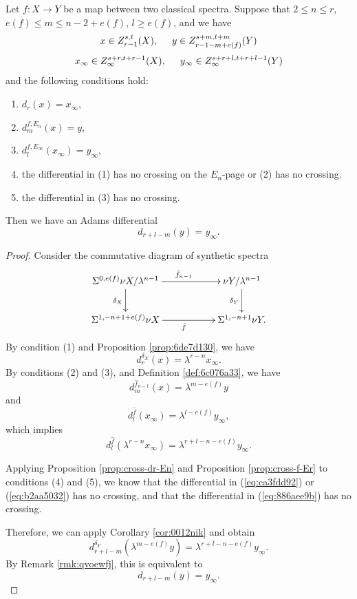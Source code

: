 \documentclass{amsart}
\numberwithin{equation}{section}
\begin{document}
\begin{theorem}\label{thm:e73f481e}
    Let $f: X\to Y$ be a map between two classical spectra.
    Suppose that $2\le n\le r$, $e(f)\le m\le n-2+e(f)$, $l\ge e(f)$, and we have
    $$x\in Z_{r-1}^{s,t}(X), \hspace{0.5cm} y\in Z_{r-1-m+e(f)}^{s+m,t+m}(Y)$$
    $$x_\infty\in Z_\infty^{s+r,t+r-1}(X), \hspace{0.5cm} y_\infty\in Z_\infty^{s+r+l,t+r+l-1}(Y)$$
    and the following conditions hold:
    \begin{enumerate}
        \item $d_{r}(x)=x_\infty$,
        \item $d_{m}^{f,E_n}(x)=y$,
        \item $d_{l}^{f,E_\infty}(x_\infty)=y_\infty$,
        \item the differential in (1) has no crossing on the $E_n$-page or (2) has no crossing.
        \item the differential in (3) has no crossing.%
    \end{enumerate}
    Then we have an Adams differential
    $$d_{r+l-m}(y)= y_\infty.$$
\end{theorem}

\begin{proof}
    Consider the commutative diagram of synthetic spectra
    $$\xymatrix{
        \Sus^{0,e(f)}\nu X/\lambda^{n-1} \ar[rr]^{\hat f_{n-1}}\ar[d]_{\delta_X} && \nu Y/\lambda^{n-1}\ar[d]_{\delta_Y}\\
        \Sus^{1,-n+1+e(f)} \nu X \ar[rr]_{\hat f} && \Sus^{1,-n+1}\nu Y.
    }$$
    By condition (1) and Proposition \ref{prop:6de7d130}, we have
    \begin{equation}\label{eq:ca3fdd92}
        d^{\delta_X}_r(x)=\lambda^{r-n}x_\infty.
    \end{equation}
    By conditions (2) and (3), and Definition \ref{def:6c076a33}, we have
    \begin{equation}\label{eq:b2aa5032}
        d^{\hat f_{n-1}}_m(x)=\lambda^{m-e(f)} y
    \end{equation}
    and
    \begin{equation*}
        d^{\hat f}_l(x_\infty)=\lambda^{l-e(f)} y_\infty, 
    \end{equation*}
    which implies
    \begin{equation}\label{eq:886aee9b}
         d^{\hat f}_l(\lambda^{r-n}x_\infty)=\lambda^{r+l-n-e(f)}y_\infty.
    \end{equation}
    
    Applying Proposition \ref{prop:cross-dr-En} and Proposition \ref{prop:cross-f-Er} to conditions (4) and (5), we know that the differential in (\ref{eq:ca3fdd92}) or (\ref{eq:b2aa5032}) has no crossing, and that the differential in (\ref{eq:886aee9b}) has no crossing.
    
    Therefore, we can apply Corollary \ref{cor:0012nik} and obtain
    $$d^{\delta_Y}_{r+l-m}(\lambda^{m-e(f)} y)=\lambda^{r+l-n-e(f)} y_\infty.$$
    By Remark \ref{rmk:qvoewfj}, this is equivalent to
    $$d_{r+l-m}(y)= y_\infty.$$
\end{proof}
\end{document}
